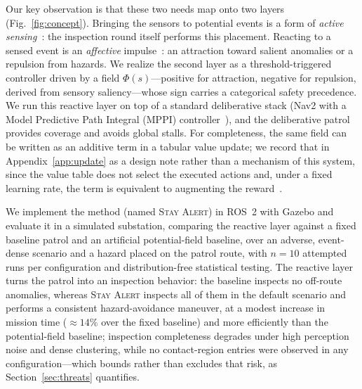 Our key observation is that these two needs map onto two layers
(Fig.~\ref{fig:concept}). Bringing the
sensors to potential events is a form of \emph{active
sensing}~\cite{bajcsy1988}: the inspection round itself performs this
placement. Reacting to a sensed event is an \emph{affective}
impulse~\cite{breazeal2003}: an attraction toward salient anomalies or a
repulsion from hazards. We realize the second layer as a
threshold-triggered controller driven by a field $\Phi(s)$---positive for
attraction, negative for repulsion, derived from sensory saliency---whose sign
carries a categorical safety precedence. We run this reactive layer on top of a
standard deliberative stack (Nav2 with a Model Predictive Path Integral (MPPI)
controller~\cite{macenski2020nav2,williams2017mppi}), and the deliberative patrol
provides coverage and avoids global stalls.
For completeness, the same field can be written as an additive term in a tabular
value update; we record that in Appendix~\ref{app:update} as a design note rather
than a mechanism of this system, since the value table does not select the executed
actions and, under a fixed learning rate, the term is equivalent to augmenting the
reward~\cite{ng1999,zhang2023apf}.

We implement the method (named \textsc{Stay Alert}) in ROS~2 with Gazebo and
evaluate it in a simulated substation, comparing the reactive layer against a
fixed baseline patrol and an artificial potential-field baseline, over an
adverse, event-dense scenario and a hazard placed on the patrol route, with
$n=10$ attempted runs per configuration and distribution-free statistical testing. The
reactive layer turns the patrol into an inspection behavior: the baseline
inspects no off-route anomalies, whereas \textsc{Stay Alert} inspects all of them
in the default scenario and performs a consistent hazard-avoidance maneuver, at a
modest increase in mission time ($\approx14\%$ over the fixed baseline) and more
efficiently than the potential-field baseline; inspection completeness degrades
under high perception noise and dense clustering, while no contact-region entries were
observed in any configuration---which bounds rather than excludes that risk, as
Section~\ref{sec:threats} quantifies.

